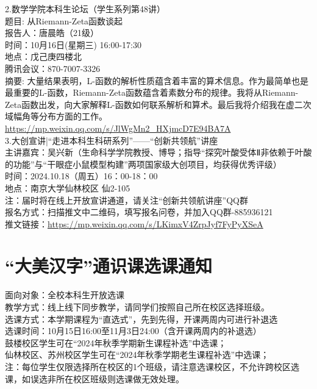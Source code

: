 \documentclass[letterpaper, 12pt]{article}
\begin{document}
\begin{multicols}{2}
2.数学学院本科生论坛（学生系列第48讲）\\
题目: 从Riemann-Zeta函数谈起\\
报告人：唐晨皓（21级）\\
时间：10月16日(星期三) 16:00-17:30\\
地点：戊己庚四楼北\\
腾讯会议：870-7007-3326\\
摘要: 大量结果表明，L-函数的解析性质蕴含着丰富的算术信息。作为最简单也是最重要的L-函数，Riemann-Zeta函数蕴含着素数分布的规律。我将从Riemann-Zeta函数出发，向大家解释L-函数如何联系解析和算术。最后我将介绍我在虚二次域幅角等分布方面的工作。
\url{https://mp.weixin.qq.com/s/JlWgMn2_HXjmcD7E94BA7A}\\

3.大创宣讲|“走进本科生科研系列”——“创新共领航”讲座\\
主讲嘉宾：吴兴新（生命科学学院教授、博导；指导“探究叶酸受体Ⅱ非依赖于叶酸的功能”与“干眼症小鼠模型构建”两项国家级大创项目，均获得优秀评级）\\
时间：2024.10.18（周五）16：00-18：00\\
地点：南京大学仙林校区 仙2-105\\
注：届时将在线上开放宣讲通道，请关注“创新共领航讲座”QQ群\\
报名方式：扫描推文中二维码，填写报名问卷，并加入QQ群-885936121\\
推文链接：\url{https://mp.weixin.qq.com/s/LKimxV4ZrpJyf7FyPyXSeA}\\



\section{“大美汉字”通识课选课通知}
面向对象：全校本科生开放选课\\
教学方式：线上线下同步教学，请同学们按照自己所在校区选择班级。\\
选课方式：本学期课程为“直选式”，先到先得，开课两周内可进行补退选\\
选课时间：10月15日16:00至11月3日24:00（含开课两周内的补退选）\\
鼓楼校区学生可在“2024年秋季学期新生课程补选”中选课；\\
仙林校区、苏州校区学生可在“2024年秋季学期老生课程补选”中选课；\\
注：每位学生仅限选择所在校区的1个班级，请注意选课校区，不允许跨校区选课，如误选非所在校区班级则选课做无效处理。\\


\end{multicols}
\end{document}
